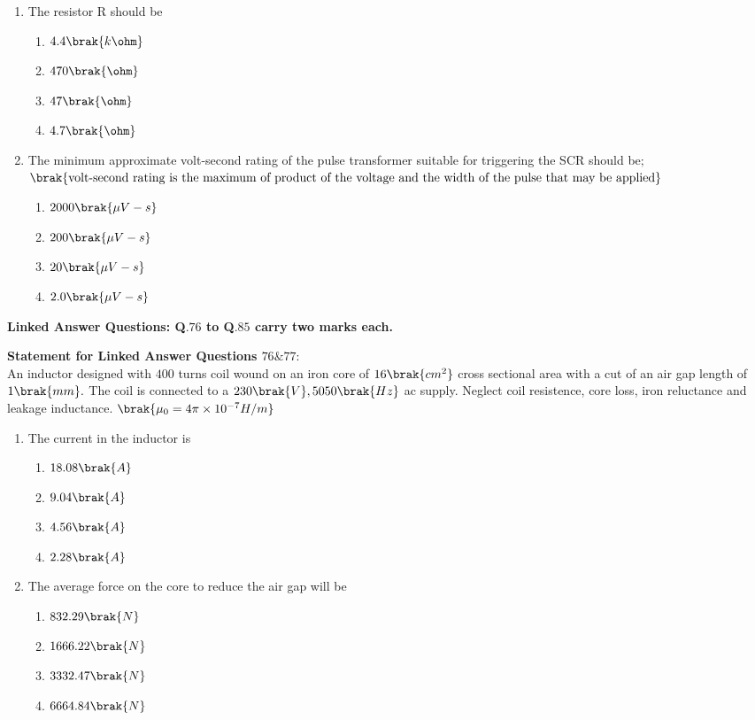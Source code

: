 \begin{enumerate}[start=74]
    \item The resistor R should be
    \begin{enumerate}
        \item $4.4\brak{k\ohm}$
        \item $470\brak{\ohm}$
        \item $47\brak{\ohm}$
        \item $4.7\brak{\ohm}$
    \end{enumerate}
    \item The minimum approximate volt-second rating of the pulse transformer suitable for triggering the SCR should be$;$ $\brak{\text{volt-second rating is the maximum of product of the voltage and the width of the pulse that may be applied}}$
    \begin{enumerate}
        \item $2000\brak{\mu V-s}$
        \item $200\brak{\mu V-s}$
        \item $20\brak{\mu V-s}$
        \item $2.0\brak{\mu V-s}$
    \end{enumerate}
\end{enumerate}
\begin{center}
    \textbf{Linked Answer Questions: Q$.76$ to Q$.85$ carry two marks each.}
\end{center}
\textbf{Statement for Linked Answer Questions $76 \& 77:$}\\
An inductor designed with $400$ turns coil wound on an iron core of $16\brak{cm^2}$ cross sectional area with a cut of an air gap length of $1\brak{mm}.$ The coil is connected to a $230\brak{V},5050\brak{Hz}$ ac supply. Neglect coil resistence, core loss, iron reluctance and leakage inductance. $\brak{\mu_0=4\pi\times10^{-7}H/m}$
\begin{enumerate}[start=76]
    \item The current in the inductor is
    \begin{enumerate}
        \item $18.08\brak{A}$
        \item $9.04\brak{A}$
        \item $4.56\brak{A}$
        \item $2.28\brak{A}$
    \end{enumerate}
    \item The average force on the core to reduce the air gap will be
    \begin{enumerate}
        \item $832.29\brak{N}$
        \item $1666.22\brak{N}$
        \item $3332.47\brak{N}$
        \item $6664.84\brak{N}$
    \end{enumerate}
\end{enumerate}
